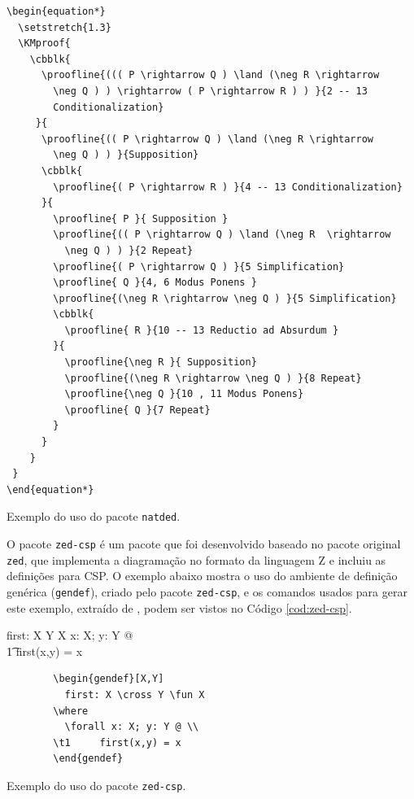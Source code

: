  \begin{listing}[ht]
 	\begin{verbatim}
\begin{equation*}
  \setstretch{1.3}
  \KMproof{
    \cbblk{
      \proofline{((( P \rightarrow Q ) \land (\neg R \rightarrow 
        \neg Q ) ) \rightarrow ( P \rightarrow R ) ) }{2 -- 13
        Conditionalization}
     }{
      \proofline{(( P \rightarrow Q ) \land (\neg R \rightarrow 
        \neg Q ) ) }{Supposition}
      \cbblk{
        \proofline{( P \rightarrow R ) }{4 -- 13 Conditionalization}
      }{
        \proofline{ P }{ Supposition }
        \proofline{(( P \rightarrow Q ) \land (\neg R  \rightarrow 
          \neg Q ) ) }{2 Repeat}
        \proofline{( P \rightarrow Q ) }{5 Simplification}
        \proofline{ Q }{4, 6 Modus Ponens }
        \proofline{(\neg R \rightarrow \neg Q ) }{5 Simplification}
        \cbblk{
          \proofline{ R }{10 -- 13 Reductio ad Absurdum }
        }{
          \proofline{\neg R }{ Supposition}
          \proofline{(\neg R \rightarrow \neg Q ) }{8 Repeat}
          \proofline{\neg Q }{10 , 11 Modus Ponens}
          \proofline{ Q }{7 Repeat}
        }
      }
    }
 }
\end{equation*}
 	\end{verbatim} 
 	\caption{Exemplo do uso do pacote \texttt{natded}.}
 	\label{cod:natded}
 \end{listing}

O pacote \texttt{zed-csp} é um pacote que foi desenvolvido baseado no pacote original \texttt{zed}, que implementa a diagramação no formato da linguagem Z e incluiu as definições para CSP. O exemplo abaixo mostra o uso do ambiente de definição genérica (\texttt{gendef}), criado pelo pacote \texttt{zed-csp}, e os comandos usados para gerar este exemplo, extraído de \parencite{zed}, podem ser vistos no Código \ref{cod:zed-csp}.
 
\begin{gendef}[X,Y]
	first: X \cross Y \fun X
\where
		\forall x: X; y: Y @ \\
\t1     first(x,y) = x
\end{gendef}

\begin{listing}[ht]
	\begin{verbatim}
		\begin{gendef}[X,Y]
		  first: X \cross Y \fun X
		\where
		  \forall x: X; y: Y @ \\
		\t1     first(x,y) = x
		\end{gendef}
	\end{verbatim} 
	\caption{Exemplo do uso do pacote \texttt{zed-csp}.}
	\label{cod:zed-csp}
\end{listing}

